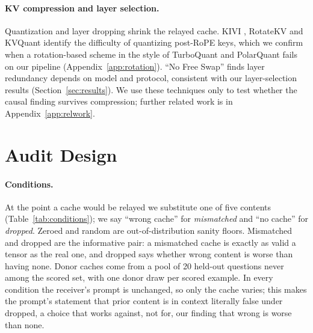\documentclass[11pt]{article}
\begin{document}
\paragraph{KV compression and layer selection.} Quantization and layer
dropping shrink the relayed cache. KIVI \citep{kivi2024}, RotateKV
\citep{rotatekv2025} and KVQuant \citep{kvquant2024} identify the
difficulty of quantizing post-RoPE keys, which we confirm when a
rotation-based scheme in the style of TurboQuant \citep{turboquant2026}
and PolarQuant \citep{polarquant2026} fails on our pipeline
(Appendix~\ref{app:rotation}). ``No Free Swap'' \citep{nofreeswap2026}
finds layer redundancy depends on model and protocol, consistent with
our layer-selection results (Section~\ref{sec:results}). We use these
techniques only to test whether the causal finding survives compression;
further related work is in Appendix~\ref{app:relwork}.

\section{Audit Design}
\label{sec:method}

\paragraph{Conditions.} At the point a cache would be relayed we
substitute one of five contents (Table~\ref{tab:conditions}); we say ``wrong
cache'' for \emph{mismatched} and ``no cache'' for \emph{dropped}. Zeroed and
random are out-of-distribution sanity floors. Mismatched and dropped are the
informative pair: a mismatched cache is exactly as valid a tensor as the real
one, and dropped says whether wrong content is worse than having none. Donor caches come from a pool of 20 held-out
questions never among the scored set, with one donor draw per scored
example. In every condition the receiver's prompt is unchanged, so only
the cache varies; this makes the prompt's statement that prior content is
in context literally false under dropped, a choice that works against,
not for, our finding that wrong is worse than none.
\end{document}
